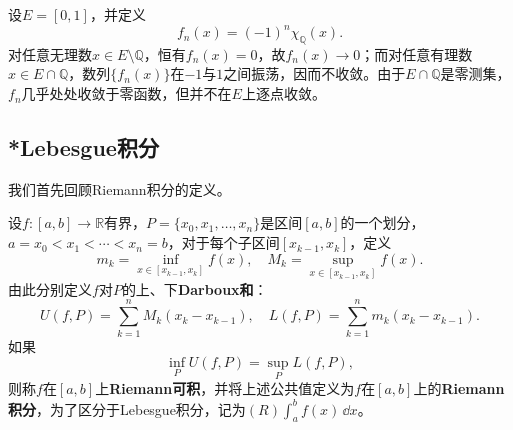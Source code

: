 \begin{example}
    设$E=[0,1]$，并定义
    \begin{equation}
        f_n(x)=(-1)^n\chi_{\mathbb{Q}}(x).
    \end{equation}
    对任意无理数$x\in E\setminus\mathbb{Q}$，恒有$f_n(x)=0$，故$f_n(x)\to 0$；而对任意有理数$x\in E\cap\mathbb{Q}$，数列$\{f_n(x)\}$在$-1$与$1$之间振荡，因而不收敛。由于$E\cap\mathbb{Q}$是零测集，$f_n$几乎处处收敛于零函数，但并不在$E$上逐点收敛。%
\end{example}
%
%
%

\subsection{*Lebesgue积分}\label{sub:integral}

我们首先回顾Riemann积分的定义。

\begin{definition}[Riemann积分]
    设$f:[a,b]\to\mathbb{R}$有界，$P=\{x_0,x_1,\dots,x_n\}$是区间$[a,b]$的一个划分，$a=x_0<x_1<\cdots <x_n=b$，对于每个子区间$[x_{k-1},x_k]$，定义
    \begin{equation}
        m_k=\inf_{x\in [x_{k-1},x_k]}f(x),\quad M_k=\sup_{x\in [x_{k-1},x_k]}f(x).
    \end{equation}
    由此分别定义$f$对$P$的上、下\textbf{Darboux和}：
    \begin{equation}
        U(f,P)=\sum_{k=1}^{n}M_k(x_k-x_{k-1}),\quad L(f,P)=\sum_{k=1}^{n}m_k(x_k-x_{k-1}).
    \end{equation}
    如果
    \begin{equation}
        \inf_{P}U(f,P)=\sup_{P}L(f,P),
    \end{equation}
    则称$f$在$[a,b]$上\textbf{Riemann可积}，并将上述公共值定义为$f$在$[a,b]$上的\textbf{Riemann积分}，为了区分于Lebesgue积分，记为$(R)\int_{a}^{b}f(x)\,\dd x$。
\end{definition}

